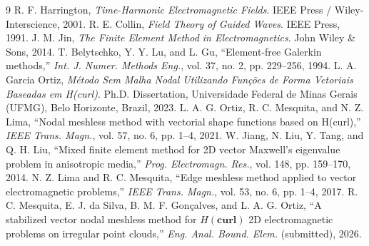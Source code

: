 \documentclass[11pt,a4paper]{article}
\begin{document}
\begin{thebibliography}{9}
 R. F. Harrington, \textit{Time-Harmonic Electromagnetic Fields}. IEEE Press / Wiley-Interscience, 2001.
 R. E. Collin, \textit{Field Theory of Guided Waves}. IEEE Press, 1991.
 J. M. Jin, \textit{The Finite Element Method in Electromagnetics}. John Wiley \& Sons, 2014.
 T. Belytschko, Y. Y. Lu, and L. Gu, ``Element-free Galerkin methods,'' \textit{Int. J. Numer. Methods Eng.}, vol. 37, no. 2, pp. 229--256, 1994.
 L. A. Garcia Ortiz, \textit{M\'etodo Sem Malha Nodal Utilizando Fun\c{c}\~oes de Forma Vetoriais Baseadas em H(curl)}. Ph.D. Dissertation, Universidade Federal de Minas Gerais (UFMG), Belo Horizonte, Brazil, 2023.
 L. A. G. Ortiz, R. C. Mesquita, and N. Z. Lima, ``Nodal meshless method with vectorial shape functions based on H(curl),'' \textit{IEEE Trans. Magn.}, vol. 57, no. 6, pp. 1--4, 2021.
 W. Jiang, N. Liu, Y. Tang, and Q. H. Liu, ``Mixed finite element method for 2D vector Maxwell's eigenvalue problem in anisotropic media,'' \textit{Prog. Electromagn. Res.}, vol. 148, pp. 159--170, 2014.
 N. Z. Lima and R. C. Mesquita, ``Edge meshless method applied to vector electromagnetic problems,'' \textit{IEEE Trans. Magn.}, vol. 53, no. 6, pp. 1--4, 2017.
 R. C. Mesquita, E. J. da Silva, B. M. F. Gon\c{c}alves, and L. A. G. Ortiz, ``A stabilized vector nodal meshless method for $H(\mathbf{curl})$ 2D electromagnetic problems on irregular point clouds,'' \textit{Eng. Anal. Bound. Elem.} (submitted), 2026.
\end{thebibliography}
\end{document}
